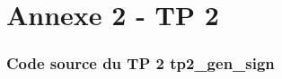 \chapter*{Annexe 2 - TP 2}

\setcounter{section}{0}
\setcounter{subsection}{0}

\subsection*{Code source du TP 2 \textbf{tp2\_gen\_sign}}

